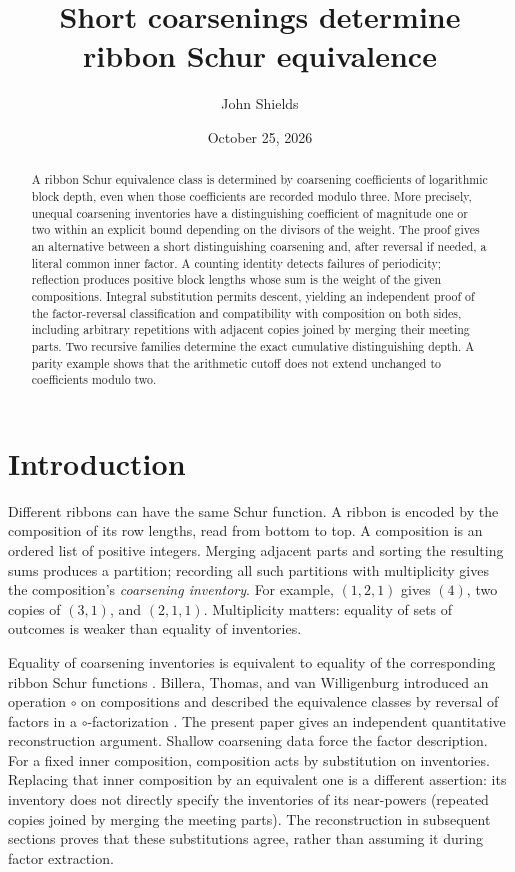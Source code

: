 \documentclass[11pt,a4paper]{amsart}
\title
{Short coarsenings determine ribbon Schur equivalence}
\author{John Shields}
\date{October 25, 2026}
\numberwithin{equation}{section}
\theoremstyle{plain}
\theoremstyle{definition}
\begin{document}
\begin{abstract}
A ribbon Schur equivalence class is determined by coarsening coefficients
of logarithmic block depth, even when those coefficients are recorded modulo
three.  More precisely, unequal coarsening inventories have a distinguishing
coefficient of magnitude one or two within an explicit bound depending on
the divisors of the weight.  The proof gives an alternative between a short
distinguishing coarsening and, after reversal if needed, a literal common
inner factor.  A counting identity detects failures of periodicity; reflection produces positive
block lengths whose sum is the weight of the given compositions.  Integral
substitution permits descent, yielding an independent proof of the
factor-reversal classification and compatibility with composition on both
sides, including arbitrary repetitions with adjacent copies joined by merging
their meeting parts.  Two recursive families determine the exact cumulative
distinguishing depth.  A parity example shows that the
arithmetic cutoff does not extend unchanged to coefficients modulo two.
\end{abstract}
\maketitle

\section{Introduction}\label{sec:introduction}

Different ribbons can have the same Schur function.  A ribbon is encoded
by the composition of its row lengths, read from bottom to top.
A composition is an ordered list of positive integers.  Merging adjacent
parts and sorting the resulting sums produces a partition; recording all
such partitions with multiplicity gives the composition's \emph{coarsening inventory}.
For example, \((1,2,1)\) gives \((4)\), two copies of \((3,1)\), and
\((2,1,1)\).  Multiplicity matters: equality of sets of outcomes is weaker
than equality of inventories.

Equality of coarsening inventories is equivalent to equality of the
corresponding ribbon Schur functions \cite[Theorem~2.6]{Billera2006DecomposableCompositions}.
Billera, Thomas, and van Willigenburg introduced an operation \(\circ\) on
compositions and described the equivalence classes by reversal of factors
in a \(\circ\)-factorization \cite[Theorem~4.1]{Billera2006DecomposableCompositions}.  The present paper gives
an independent quantitative reconstruction argument.  Shallow coarsening
data force the factor description.
For a fixed inner composition, composition acts by substitution on
inventories.  Replacing that inner composition by an equivalent one is a
different assertion: its inventory does not directly specify the
inventories of its near-powers (repeated copies joined by merging the
meeting parts).  The reconstruction in subsequent sections proves that
these substitutions agree, rather than assuming it during factor extraction.
\end{document}
